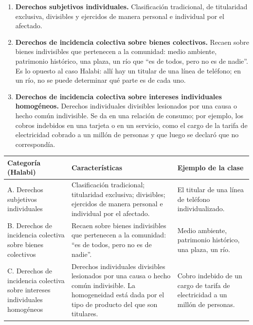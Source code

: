 \documentclass[12pt,oneside]{book}
\begin{document}
\begin{enumerate}[label=\textbf{\Alph*.}]
\item \textbf{Derechos subjetivos individuales.} Clasificaci\'on tradicional, de titularidad exclusiva, divisibles y ejercidos de manera personal e individual por el afectado.
\item \textbf{Derechos de incidencia colectiva sobre bienes colectivos.} Recaen sobre bienes indivisibles que pertenecen a la comunidad: medio ambiente, patrimonio hist\'orico, una plaza, un r\'io que ``es de todos, pero no es de nadie''. Es lo opuesto al caso Halabi: all\'i hay un titular de una l\'inea de tel\'efono; en un r\'io, no se puede determinar qu\'e parte es de cada uno.
\item \textbf{Derechos de incidencia colectiva sobre intereses individuales homog\'eneos.} Derechos individuales divisibles lesionados por una causa o hecho com\'un indivisible. Se da en una relaci\'on de consumo; por ejemplo, los cobros indebidos en una tarjeta o en un servicio, como el cargo de la tarifa de electricidad cobrado a un mill\'on de personas y que luego se declar\'o que no correspond\'ia.
\end{enumerate}

\begin{center}
{\small\renewcommand{\arraystretch}{1.25}
\begin{tabularx}{\textwidth}{@{}B{0.24\textwidth} Y Y@{}}
\toprule
\textbf{Categor\'ia (Halabi)} & \textbf{Caracter\'isticas} & \textbf{Ejemplo de la clase} \\
\midrule
A. Derechos subjetivos individuales & Clasificaci\'on tradicional; titularidad exclusiva; divisibles; ejercidos de manera personal e individual por el afectado. & El titular de una l\'inea de tel\'efono individualizado. \\
\addlinespace
B. Derechos de incidencia colectiva sobre bienes colectivos & Recaen sobre bienes indivisibles que pertenecen a la comunidad: ``es de todos, pero no es de nadie''. & Medio ambiente, patrimonio hist\'orico, una plaza, un r\'io. \\
\addlinespace
C. Derechos de incidencia colectiva sobre intereses individuales homog\'eneos & Derechos individuales divisibles lesionados por una causa o hecho com\'un indivisible. La homogeneidad est\'a dada por el tipo de producto del que son titulares. & Cobro indebido de un cargo de tarifa de electricidad a un mill\'on de personas. \\
\bottomrule
\end{tabularx}}
\end{center}
\end{document}
